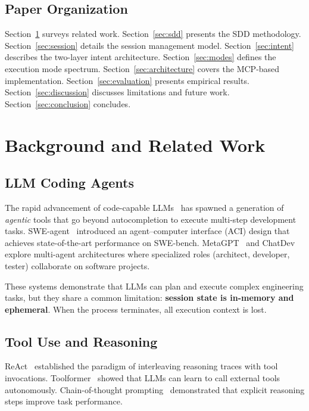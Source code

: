 \documentclass[11pt,letterpaper]{article}
\begin{document}
\subsection{Paper Organization}

Section~\ref{sec:background} surveys related work.
Section~\ref{sec:sdd} presents the SDD methodology.
Section~\ref{sec:session} details the session management model.
Section~\ref{sec:intent} describes the two-layer intent architecture.
Section~\ref{sec:modes} defines the execution mode spectrum.
Section~\ref{sec:architecture} covers the MCP-based implementation.
Section~\ref{sec:evaluation} presents empirical results.
Section~\ref{sec:discussion} discusses limitations and future work.
Section~\ref{sec:conclusion} concludes.

\section{Background and Related Work}
\label{sec:background}

\subsection{LLM Coding Agents}

The rapid advancement of code-capable LLMs~\cite{chen2021codex,
roziere2024codellama} has spawned a generation of \emph{agentic} tools
that go beyond autocompletion to execute multi-step development tasks.
SWE-agent~\cite{yang2024swe} introduced an agent--computer interface
(ACI) design that achieves state-of-the-art performance on SWE-bench.
MetaGPT~\cite{hong2024metagpt} and ChatDev~\cite{qian2024chatdev} explore
multi-agent architectures where specialized roles (architect, developer,
tester) collaborate on software projects.

These systems demonstrate that LLMs can plan and execute complex
engineering tasks, but they share a common limitation:
\textbf{session state is in-memory and ephemeral}.  When the process
terminates, all execution context is lost.

\subsection{Tool Use and Reasoning}

ReAct~\cite{yao2023react} established the paradigm of interleaving
reasoning traces with tool invocations.
Toolformer~\cite{schick2023toolformer} showed that LLMs can learn to
call external tools autonomously.  Chain-of-thought
prompting~\cite{wei2022chain} demonstrated that explicit reasoning steps
improve task performance.
\end{document}
